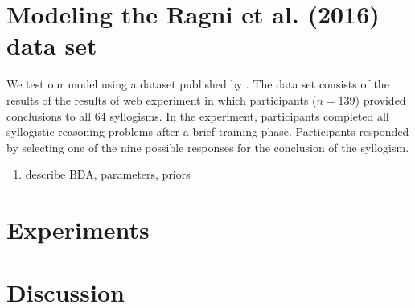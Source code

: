 \documentclass[floatsintext, doc]{apa6}
\begin{document}


\section{Modeling the Ragni et al. (2016) data set}

We test our model using a dataset published by . The data set consists of the results of the results of web experiment in which participants ($n = 139$) provided conclusions to all 64 syllogisms. In the experiment, participants completed all syllogistic reasoning problems after a brief training phase. Participants responded by selecting one of the nine possible responses for the conclusion of the syllogism.


\begin{enumerate}
\item describe BDA, parameters, priors
\end{enumerate}


\section{Experiments}

\section{Discussion}


\newpage



\end{document}
